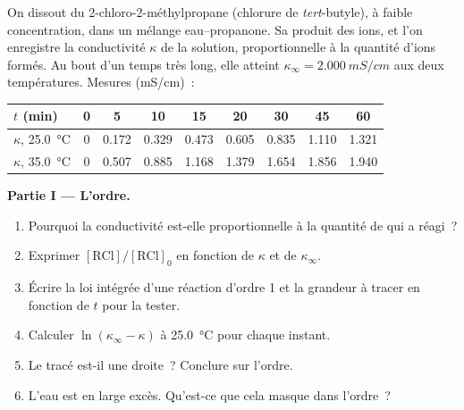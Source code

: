\begin{problem}
\label{pb:b1:nucleophilic-substitution:1}
On dissout du 2-chloro-2-méthylpropane (chlorure de \textit{tert}-butyle),
à faible concentration, dans un mélange eau--propanone. Sa 
 produit des ions, et l'on
enregistre la conductivité $\kappa$ de la solution, proportionnelle à la
quantité d'ions formés. Au bout d'un temps très long, elle atteint
$\kappa_\infty = \qty{2.000}{mS/cm}$ aux deux températures. Mesures
(\unit{mS/cm})~:

\begin{center}
\begin{tabular}{lcccccccc}
\hline
$t$ (min) & 0 & 5 & 10 & 15 & 20 & 30 & 45 & 60 \\
\hline
$\kappa$, \qty{25.0}{\celsius} & 0 & 0.172 & 0.329 & 0.473 & 0.605 & 0.835 & 1.110 & 1.321 \\
$\kappa$, \qty{35.0}{\celsius} & 0 & 0.507 & 0.885 & 1.168 & 1.379 & 1.654 & 1.856 & 1.940 \\
\hline
\end{tabular}
\end{center}

\medskip
\noindent\textbf{Partie I --- L'ordre.}
\begin{enumerate}
  \item Pourquoi la conductivité est-elle proportionnelle à la quantité
        de  qui a réagi~?
  \item Exprimer $[\mathrm{RCl}]/[\mathrm{RCl}]_0$ en fonction de $\kappa$
        et de $\kappa_\infty$.
  \item Écrire la loi intégrée d'une réaction d'ordre 1 et la grandeur à
        tracer en fonction de $t$ pour la tester.
  \item Calculer $\ln(\kappa_\infty - \kappa)$ à \qty{25.0}{\celsius}
        pour chaque instant.
  \item Le tracé est-il une droite~? Conclure sur l'ordre.
  \item L'eau est en large excès. Qu'est-ce que cela masque dans
        l'ordre~?
\end{enumerate}


\end{problem}
